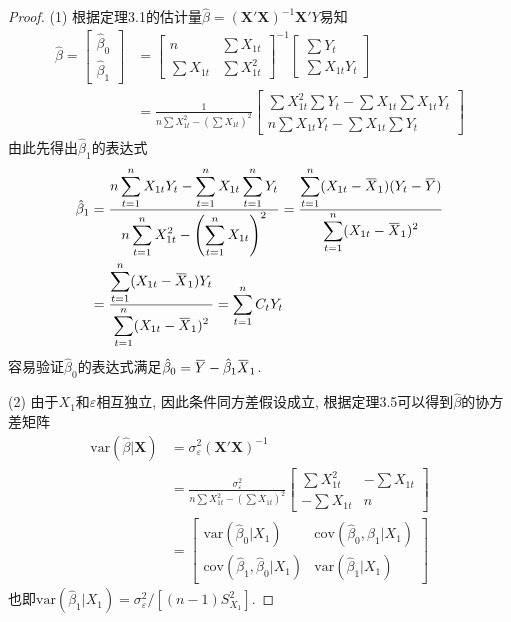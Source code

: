 \documentclass[cn,12pt,math=mtpro2,citestyle=gb7714-2015,bibstyle=gb7714-2015,twocol,mode=simple]{elegantbook}
\newcommand{\overbar}[1]{\mkern 1.5mu\overline{\mkern-1.5mu#1\mkern-1.5mu}\mkern 1.5mu}
\newcommand{\var}{\text{var}}
\newcommand{\hbeta}{\hat{\beta}}
\begin{document}
\begin{proof}
  (1) 根据定理3.1的估计量$\hbeta=(\mathbf{X}'\mathbf{X})^{-1}\mathbf{X}'Y$易知
\begin{align}
\hbeta=\begin{bmatrix}
\hbeta_0 \\
\hbeta_1
\end{bmatrix}&=\begin{bmatrix}
 n & \sum X_{1t}\\
 \sum X_{1t} & \sum X_{1t}^2
\end{bmatrix}^{-1}\begin{bmatrix}
\sum Y_t \\
\sum X_{1t}Y_t
\end{bmatrix} \nonumber \\
&=\frac{1}{n\sum X_{1t}^2-(\sum X_{1t})^2}\begin{bmatrix}
\sum X_{1t}^2\sum Y_t-\sum X_{1t}\sum X_{1t}Y_t \\
n\sum X_{1t}Y_t-\sum X_{1t}\sum Y_t
\end{bmatrix}\nonumber
\end{align}
由此先得出$\hbeta_1$的表达式
\begin{align}
\hbeta_1&=\frac{\displaystyle n\sum_{t=1}^{n} X_{1t}Y_t-\sum_{t=1}^{n} X_{1t}\sum_{t=1}^{n} Y_t}{\displaystyle n\sum_{t=1}^{n} X_{1t}^2-\left(\sum_{t=1}^{n} X_{1t}\right)^2}=\frac{\displaystyle \sum_{t=1}^{n}(X_{1t}-\overbar{X}_1)(Y_t-\overbar{Y})}{\displaystyle \sum_{t=1}^{n}(X_{1t}-\overbar{X}_1)^2} \nonumber \\
&=\frac{\displaystyle \sum_{t=1}^{n}(X_{1t}-\overbar{X}_1)Y_t}{\displaystyle \sum_{t=1}^{n}(X_{1t}-\overbar{X}_1)^2}=\sum_{t=1}^{n}C_tY_t \nonumber
\end{align}
容易验证$\hbeta_0$的表达式满足$\hbeta_0=\overbar{Y}-\hbeta_1\overbar{X}_1$.

(2) 由于$X_1$和$\varepsilon$相互独立, 因此条件同方差假设成立,  根据定理3.5可以得到$\hbeta$的协方差矩阵
\begin{align}
\var(\hbeta|\mathbf{X})&=\sigma^2_\varepsilon(\mathbf{X}'\mathbf{X})^{-1} \nonumber \\
&=\frac{\sigma^2_\varepsilon}{n \sum X_{1t}^2-(\sum X_{1t})^2}\begin{bmatrix}
 \sum X_{1t}^2 & -\sum X_{1t}\\
 -\sum X_{1t} & n
\end{bmatrix} \nonumber \\
&=\begin{bmatrix}
 \var(\hbeta_0|X_1) & \text{cov}(\hbeta_0,\hbeta_1|X_1) \\
 \text{cov}(\hbeta_1,\hbeta_0|X_1) & \var(\hbeta_1|X_1)
\end{bmatrix} \nonumber
\end{align}
也即$\var(\hbeta_1|X_1)=\sigma^2_{\varepsilon}/[(n-1)S^2_{X_1}]$.


\end{proof}
\end{document}
